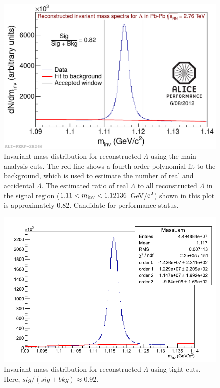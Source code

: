 \begin{figure}[hbtp]
\includegraphics[scale=0.6]{2012-Aug-07-LamInvMass_Perf.pdf}
\caption[Invariant mass distribution for reconstructed $\Lambda$]{Invariant mass distribution for reconstructed $\Lambda$ using the main analysis cuts.  The red line shows a fourth order polynomial fit to the background, which is used to estimate the number of real and accidental $\Lambda$.  The estimated ratio of real $\Lambda$ to all reconstructed $\Lambda$ in the signal region ($ 1.11 < m_{\rm inv} < 1.12136$ GeV/${\rm c^2}$) shown in this plot is approximately 0.82.  Candidate for performance status.}
\label{fig:MassLooseCut}
\end{figure}

\begin{figure}[hbtp]
\includegraphics[scale=0.5]{11h_V0_MassLam_TightCuts.png}
\caption[Invariant mass distribution for reconstructed $\Lambda$ using tight cuts]{Invariant mass distribution for reconstructed $\Lambda$ using tight cuts.  Here, $sig/(sig+bkg) \approx 0.92$.}
\label{fig:MassTightCut}
\end{figure}
		


